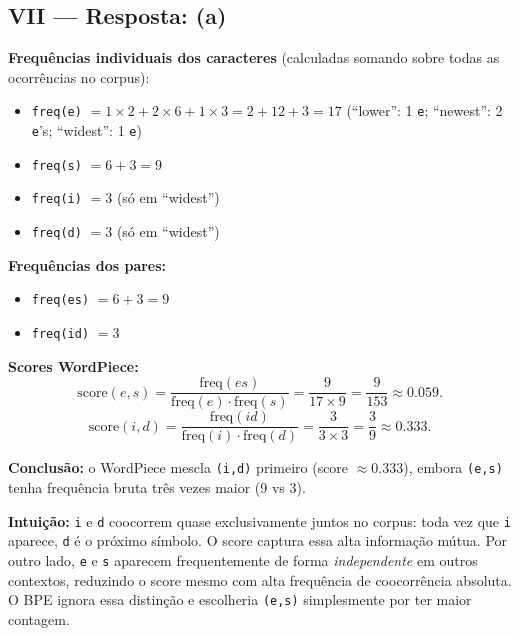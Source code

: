 \documentclass{dlproblemset}
\begin{document}
\subsection*{VII — Resposta: (a)}

\textbf{Frequências individuais dos caracteres} (calculadas somando sobre todas as
ocorrências no corpus):
\begin{itemize}
  \item \texttt{freq(e)} $= 1{\times}2 + 2{\times}6 + 1{\times}3 = 2 + 12 + 3 = 17$
        \quad (``lower'': 1 \texttt{e}; ``newest'': 2 \texttt{e}'s; ``widest'': 1 \texttt{e})
  \item \texttt{freq(s)} $= 6 + 3 = 9$
  \item \texttt{freq(i)} $= 3$ \quad (só em ``widest'')
  \item \texttt{freq(d)} $= 3$ \quad (só em ``widest'')
\end{itemize}

\textbf{Frequências dos pares:}
\begin{itemize}
  \item \texttt{freq(es)} $= 6 + 3 = 9$
  \item \texttt{freq(id)} $= 3$
\end{itemize}

\textbf{Scores WordPiece:}
\[
  \mathrm{score}(e, s)
  = \frac{\mathrm{freq}(es)}{\mathrm{freq}(e) \cdot \mathrm{freq}(s)}
  = \frac{9}{17 \times 9}
  = \frac{9}{153}
  \approx 0.059.
\]
\[
  \mathrm{score}(i, d)
  = \frac{\mathrm{freq}(id)}{\mathrm{freq}(i) \cdot \mathrm{freq}(d)}
  = \frac{3}{3 \times 3}
  = \frac{3}{9}
  \approx 0.333.
\]

\textbf{Conclusão:} o WordPiece mescla \texttt{(i,d)} primeiro (score $\approx 0.333$),
embora \texttt{(e,s)} tenha frequência bruta três vezes maior (9 vs 3).

\textbf{Intuição:} \texttt{i} e \texttt{d} coocorrem quase exclusivamente juntos no
corpus: toda vez que \texttt{i} aparece, \texttt{d} é o próximo símbolo. O score
captura essa alta informação mútua. Por outro lado, \texttt{e} e \texttt{s} aparecem
frequentemente de forma \emph{independente} em outros contextos, reduzindo o score
mesmo com alta frequência de coocorrência absoluta. O BPE ignora essa distinção e
escolheria \texttt{(e,s)} simplesmente por ter maior contagem.

\end{document}
